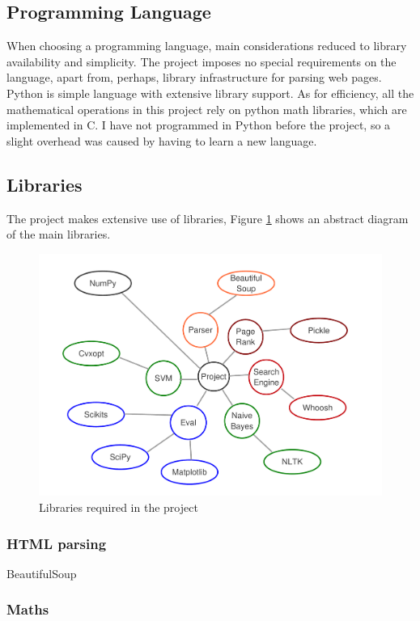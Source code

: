 \documentclass[12pt,notitlepage,twoside]{scrreprt}
\begin{document}
\subsection{Programming Language}

When choosing a programming language, main considerations reduced to library availability
and simplicity. The project imposes no special  requirements on the language, apart from,
perhaps, library infrastructure for parsing web pages.  Python is simple language with
extensive library support. As for efficiency, all the mathematical operations in this
project rely on python math libraries, which are implemented in C. I have not programmed
in Python before the project, so a slight overhead was caused by having to learn a new
language.

\subsection{Libraries}
The project makes extensive use of libraries, Figure \ref{libs} shows an abstract diagram
of the main libraries.
\begin{figure}[h]
	\centering
	\includegraphics[width=\textwidth]{figs/libs.pdf}
	\caption{Libraries required in the project\label{libs}}
\end{figure}
\subsubsection*{HTML parsing}
BeautifulSoup
\subsubsection*{Maths}
\end{document}
